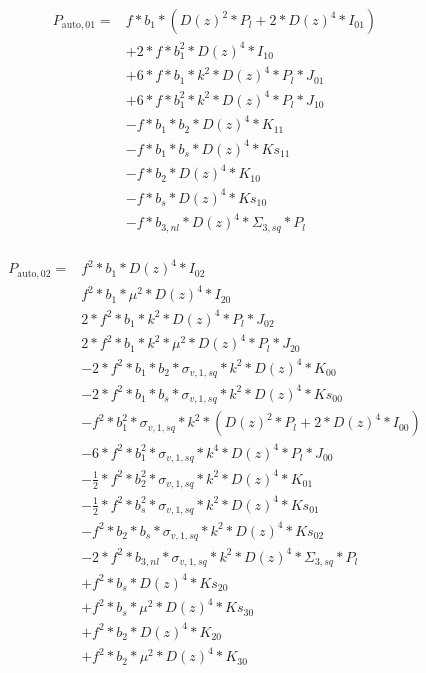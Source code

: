 \documentclass{article}
\begin{document}
\begin{equation}
\begin{aligned}          
P_{\mathrm{auto},01}=&f*b_{1}*(D(z)^{2}*P_l + 2*D(z)^{4}*I_{01}) \\
&+2*f*b_{1}^{2}*D(z)^{4}*I_{10} \\
&+6*f*b_{1}*k^{2}*D(z)^{4}*P_l*J_{01} \\
&+6*f*b_{1}^{2}*k^{2}*D(z)^{4}*P_l*J_{10} \\
&-f*b_{1}*b_{2}*D(z)^{4}*K_{11} \\
&-f*b_{1}*b_{s}*D(z)^{4}*Ks_{11} \\
&-f*b_{2}*D(z)^{4}*K_{10} \\
&-f*b_{s}*D(z)^{4}*Ks_{10} \\
&-f*b_{3,nl}*D(z)^{4}*\Sigma_{3,sq}*P_l \\
\end{aligned}
\end{equation}


\begin{equation}
\begin{aligned}  
P_{\mathrm{auto},02}=
&f^{2}*b_{1}*D(z)^{4}*I_{02} \\
&f^{2}*b_{1}*\mu^{2}*D(z)^{4}*I_{20} \\
&2*f^{2}*b_{1}*k^{2}*D(z)^{4}*P_l*J_{02} \\
&2*f^{2}*b_{1}*k^{2}*\mu^{2}*D(z)^{4}*P_l*J_{20} \\
&-2*f^{2}*b_{1}*b_{2}*\sigma_{v,1,sq}*k^{2}*D(z)^{4}*K_{00} \\
&-2*f^{2}*b_{1}*b_{s}*\sigma_{v,1,sq}*k^{2}*D(z)^{4}*Ks_{00} \\
&-f^{2}*b_{1}^{2}*\sigma_{v,1,sq}*k^{2}*(D(z)^{2}*P_l + 2*D(z)^{4}*I_{00})\\
&-6*f^{2}*b_{1}^{2}*\sigma_{v,1,sq}*k^{4}*D(z)^{4}*P_l*J_{00} \\
&-\frac{1}{2}*f^{2}*b_{2}^{2}*\sigma_{v,1,sq}*k^{2}*D(z)^{4}*K_{01}\\
&-\frac{1}{2}*f^{2}*b_{s}^{2}*\sigma_{v,1,sq}*k^{2}*D(z)^{4}*Ks_{01}\\
&-f^{2}*b_{2}*b_{s}*\sigma_{v,1,sq}*k^{2}*D(z)^{4}*Ks_{02}\\
&-2*f^{2}*b_{3,nl}*\sigma_{v,1,sq}*k^{2}*D(z)^{4}*\Sigma_{3,sq}*P_l \\
&+f^{2}*b_{s}*D(z)^{4}*Ks_{20} \\
&+f^{2}*b_{s}*\mu^{2}*D(z)^{4}*Ks_{30} \\
&+f^{2}*b_{2}*D(z)^{4}*K_{20} \\
&+f^{2}*b_{2}*\mu^{2}*D(z)^{4}*K_{30} \\
\end{aligned}
\end{equation}
\end{document}
